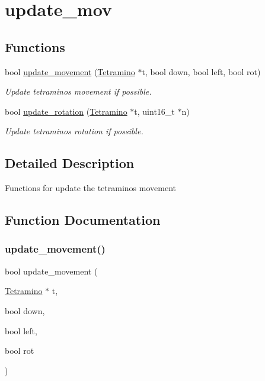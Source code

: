\hypertarget{group__update__mov}{}\section{update\+\_\+mov}
\label{group__update__mov}
\subsection*{Functions}
\begin{DoxyCompactItemize}
\item 
bool \mbox{\hyperlink{group__update__mov_ga2ccd7d6cf601a13f15d3d3f49ba81470}{update\+\_\+movement}} (\mbox{\hyperlink{struct_tetramino}{Tetramino}} $\ast$t, bool down, bool left, bool rot)
\begin{DoxyCompactList}\small\item\em Update tetramino\textquotesingle{}s movement if possible. \end{DoxyCompactList}\item 
bool \mbox{\hyperlink{group__update__mov_ga8721950ab9fce53424e645c9ba3e8e5a}{update\+\_\+rotation}} (\mbox{\hyperlink{struct_tetramino}{Tetramino}} $\ast$t, uint16\+\_\+t $\ast$n)
\begin{DoxyCompactList}\small\item\em Update tetramino\textquotesingle{}s rotation if possible. \end{DoxyCompactList}\end{DoxyCompactItemize}


\subsection{Detailed Description}
Functions for update the tetraminos movement 

\subsection{Function Documentation}
\mbox{\label{group__update__mov_ga2ccd7d6cf601a13f15d3d3f49ba81470}} 
\subsubsection{\texorpdfstring{update\+\_\+movement()}{update\_movement()}}
{\footnotesize\ttfamily bool update\+\_\+movement (\begin{DoxyParamCaption}\item[{\mbox{\hyperlink{struct_tetramino}{Tetramino}} $\ast$}]{t,  }\item[{bool}]{down,  }\item[{bool}]{left,  }\item[{bool}]{rot }\end{DoxyParamCaption})}



